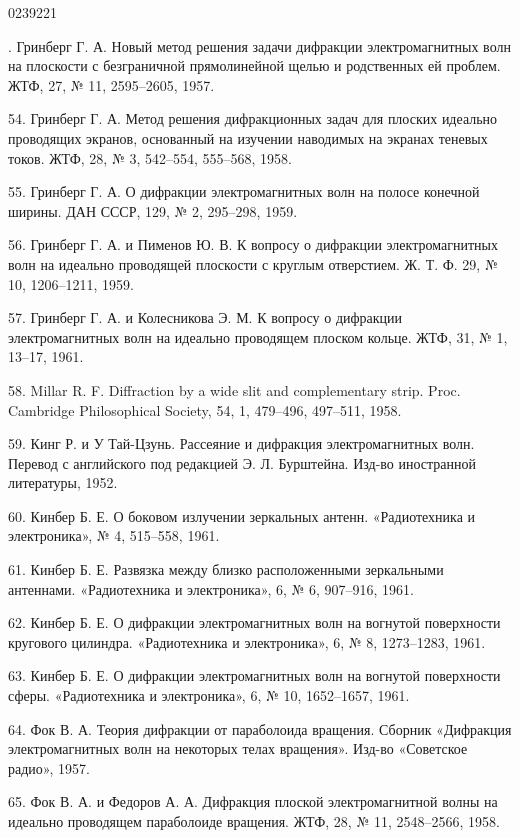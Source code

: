 \begin{scanpage}{0239}{221}
{\cyrillicfont\small
{}. Гринберг Г. А. Новый метод решения задачи дифракции электромагнитных волн на плоскости с безграничной прямолинейной щелью и родственных ей проблем. ЖТФ, 27, № 11, 2595--2605, 1957.\par
54. Гринберг Г. А. Метод решения дифракционных задач для плоских идеально проводящих экранов, основанный на изучении наводимых на экранах теневых токов. ЖТФ, 28, № 3, 542--554, 555--568, 1958.\par
55. Гринберг Г. А. О дифракции электромагнитных волн на полосе конечной ширины. ДАН СССР, 129, № 2, 295--298, 1959.\par
56. Гринберг Г. А. и Пименов Ю. В. К вопросу о дифракции электромагнитных волн на идеально проводящей плоскости с круглым отверстием. Ж. Т. Ф. 29, № 10, 1206--1211, 1959.\par
57. Гринберг Г. А. и Колесникова Э. М. К вопросу о дифракции электромагнитных волн на идеально проводящем плоском кольце. ЖТФ, 31, № 1, 13--17, 1961.\par
58. Millar R. F. Diffraction by a wide slit and complementary strip. Proc. Cambridge Philosophical Society, 54, 1, 479--496, 497--511, 1958.\par
59. Кинг Р. и У Тай-Цзунь. Рассеяние и дифракция электромагнитных волн. Перевод с английского под редакцией Э. Л. Бурштейна. Изд-во иностранной литературы, 1952.\par
60. Кинбер Б. Е. О боковом излучении зеркальных антенн. «Радиотехника и электроника», № 4, 515--558, 1961.\par
61. Кинбер Б. Е. Развязка между близко расположенными зеркальными антеннами. «Радиотехника и электроника», 6, № 6, 907--916, 1961.\par
62. Кинбер Б. Е. О дифракции электромагнитных волн на вогнутой поверхности кругового цилиндра. «Радиотехника и электроника», 6, № 8, 1273--1283, 1961.\par
63. Кинбер Б. Е. О дифракции электромагнитных волн на вогнутой поверхности сферы. «Радиотехника и электроника», 6, № 10, 1652--1657, 1961.\par
64. Фок В. А. Теория дифракции от параболоида вращения. Сборник «Дифракция электромагнитных волн на некоторых телах вращения». Изд-во «Советское радио», 1957.\par
65. Фок В. А. и Федоров А. А. Дифракция плоской электромагнитной волны на идеально проводящем параболоиде вращения. ЖТФ, 28, № 11, 2548--2566, 1958.\par
}
\end{scanpage}
